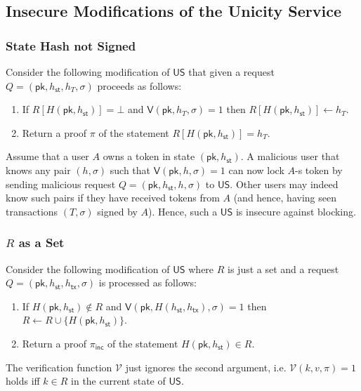 \documentclass{article}
\newcommand{\sigver}[0]{\mathsf{V}}
\newcommand{\pubkey}[0]{\mathsf{pk}}
\newcommand{\unisrv}[0]{\mathsf{US}}
\newcommand{\sthash}[0]{h_\mathsf{st}}
\newcommand{\txhash}[0]{h_\mathsf{tx}}
\newcommand{\univer}[0]{\mathcal{V}}
\newcommand{\pinc}[0]{\pi_{\mathsf{inc}}}
\begin{document}
\subsection{Insecure Modifications of the Unicity Service}

\subsubsection{State Hash not Signed}

Consider the following modification of $\mathsf{US}$ that given a request $Q=(\pubkey, h_\mathsf{st}, h_T, \sigma)$ proceeds as follows:
\begin{enumerate}
\item If $R[H(\pubkey, h_\mathsf{st})]=\bot$ and $\sigver(\pubkey, h_T, \sigma)=1$ then $R[H(\pubkey, h_\mathsf{st})]\gets h_T$.
\item Return a proof $\pi$ of the statement $R[H(\pubkey, h_\mathsf{st})]=h_T$.
\end{enumerate}

\noindent Assume that a user $A$ owns a token in state $(\pubkey,\sthash)$.
A malicious user that knows any pair  $(h,\sigma)$ such that $\sigver(\pubkey,h,\sigma)=1$
can now lock $A$-s token by sending malicious request $Q=(\pubkey,\sthash, h, \sigma)$ to $\mathsf{US}$.
Other users may indeed know such pairs if they have received tokens from $A$ (and hence, having seen transactions $(T,\sigma)$ signed by $A$).
Hence, such a $\unisrv$ is insecure against blocking.

\subsubsection{$R$ as a Set}

Consider the following modification of $\mathsf{US}$ where $R$ is just a set and a request $Q=(\pubkey, \sthash, \txhash, \sigma)$ is processed as follows:
\begin{enumerate}
\item If $H(\pubkey, \sthash)\not\in R$ and $\mathsf{V}(\pubkey, H(\sthash, \txhash), \sigma)=1$ then $R\gets R \cup \{H(\pubkey, \sthash)\}$.
\item Return a proof $\pinc$ of the statement $H(\pubkey, \sthash)\in R$.
\end{enumerate}

\noindent The verification function $\univer$ just ignores the second argument, i.e.  $\univer(k,v,\pi)=1$ holds iff $k\in R$ in the current state of $\unisrv$. \medskip
\end{document}
